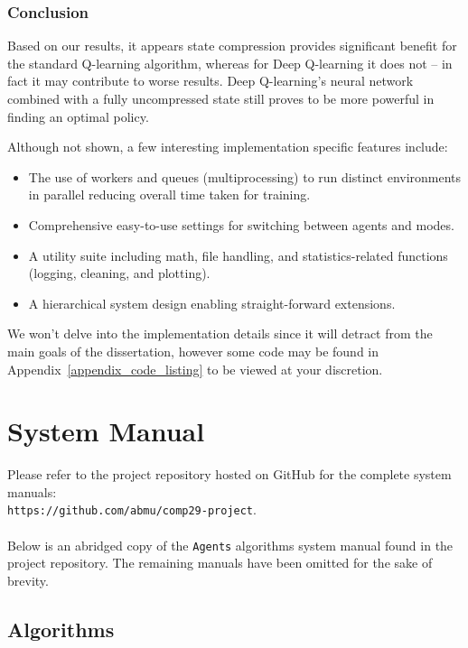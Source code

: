 \documentclass[a4paper]{report}
\begin{document}
\subsection{Conclusion}

Based on our results, it appears state compression provides significant benefit for the standard Q-learning algorithm, whereas for Deep Q-learning it does not -- in fact it may contribute to worse results. Deep Q-learning's neural network combined with a fully uncompressed state still proves to be more powerful in finding an optimal policy.

Although not shown, a few interesting implementation specific features include:

\begin{itemize}
  \item The use of workers and queues (multiprocessing) to run distinct environments in parallel reducing overall time taken for training.
  \item Comprehensive easy-to-use settings for switching between agents and modes.
  \item A utility suite including math, file handling, and statistics-related functions (logging, cleaning, and plotting).
  \item A hierarchical system design enabling straight-forward extensions.
\end{itemize}

We won't delve into the implementation details since it will detract from the main goals of the dissertation, however some code may be found in Appendix~\ref{appendix_code_listing} to be viewed at your discretion.

\chapter{System Manual}

Please refer to the project repository hosted on GitHub for the complete system manuals:\\\texttt{https://github.com/abmu/comp29-project}.
\\ \\
Below is an abridged copy of the \texttt{Agents} algorithms system manual found in the project repository. The remaining manuals have been omitted for the sake of brevity.

\section{Algorithms}
\end{document}
